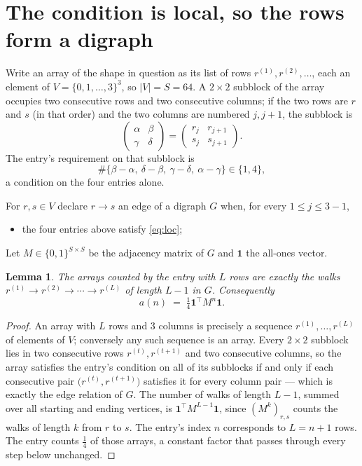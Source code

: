 \documentclass[11pt,a4paper]{article}
\theoremstyle{plain}
\newtheorem{lemma}[theorem]{Lemma}
\theoremstyle{definition}
\begin{document}
\section{The condition is local, so the rows form a digraph}

Write an array of the shape in question as its list of rows
$r^{(1)},r^{(2)},\dots$, each an element of
$V=\{0,1,\dots,3\}^{3}$, so $|V|=S=64$. A $2\times2$ subblock of the array
occupies two consecutive rows and two consecutive columns; if the two rows are $r$
and $s$ (in that order) and the two columns are numbered $j,j+1$,
the subblock is
\[
\begin{pmatrix}\alpha&\beta\\\gamma&\delta\end{pmatrix}=\begin{pmatrix}r_j&r_{j+1}\\s_j&s_{j+1}\end{pmatrix}.
\]
The entry's requirement on that subblock is
\begin{equation}\label{eq:loc}
\#\{\beta-\alpha,\ \delta-\beta,\ \gamma-\delta,\ \alpha-\gamma\}\in\{1,4\},
\end{equation}
a condition on the four entries alone.

For $r,s\in V$ declare $r\to s$ an edge of a digraph $G$ when, for every
$1\le j\le 3-1$,
\begin{itemize}
\item the four entries above satisfy \eqref{eq:loc};

\end{itemize}
Let $M\in\{0,1\}^{S\times S}$ be the adjacency matrix of $G$ and $\mathbf{1}$ the
all-ones vector.

\begin{lemma}\label{lem:walk}
The arrays counted by the entry with $L$ rows are exactly the walks
$r^{(1)}\to r^{(2)}\to\cdots\to r^{(L)}$ of length $L-1$ in $G$. Consequently
\[
a(n)\;=\;\tfrac1{4}\mathbf{1}^{\!\top}M^{n}\mathbf{1} .
\]
\end{lemma}

\begin{proof}
An array with $L$ rows and $3$ columns is precisely a sequence
$r^{(1)},\dots,r^{(L)}$ of elements of $V$; conversely any such sequence is an array.
Every $2\times2$ subblock lies in two consecutive rows $r^{(t)},r^{(t+1)}$ and two
consecutive columns, so the array satisfies the entry's condition on all of its subblocks
if and only if each consecutive pair $\bigl(r^{(t)},r^{(t+1)}\bigr)$ satisfies it for
every column pair --- which is exactly the edge relation of $G$. The number of walks of
length $L-1$, summed over all starting and ending vertices, is
$\mathbf{1}^{\!\top}M^{L-1}\mathbf{1}$, since $(M^{k})_{r,s}$ counts the walks of
length $k$ from $r$ to $s$. The entry's index $n$ corresponds to $L=n+1$ rows. The entry counts $\tfrac1{4}$ of those arrays, a constant factor that passes through every step below unchanged.
\end{proof}
\end{document}
